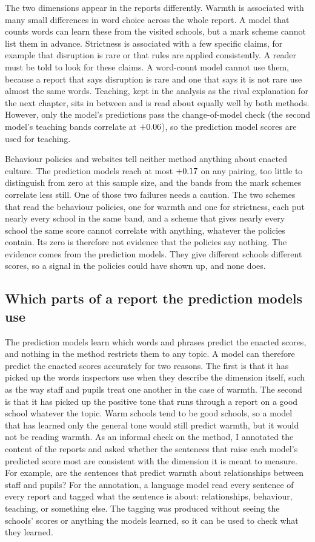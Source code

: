 The two dimensions appear in the reports differently. Warmth is associated with many small differences in word choice across the whole report. A model that counts words can learn these from the visited schools, but a mark scheme cannot list them in advance. Strictness is associated with a few specific claims, for example that disruption is rare or that rules are applied consistently. A reader must be told to look for these claims. A word-count model cannot use them, because a report that says disruption is rare and one that says it is not rare use almost the same words. Teaching, kept in the
analysis as the rival explanation for the next chapter, sits in between and is read about
equally well by both methods. However, only the model's predictions pass the change-of-model check (the second model's teaching bands correlate at $+0.06$), so
the prediction model scores are used for teaching.

Behaviour policies and websites tell neither method anything about enacted culture. The prediction
models reach at most $+0.17$ on any pairing, too little to distinguish from zero at this
sample size, and the bands from the mark schemes correlate less still. One of those two failures needs a caution. The
two schemes that read the behaviour policies, one for warmth and one for strictness, each put
nearly every school in the same band, and a scheme that gives nearly every school the same score
cannot correlate with anything, whatever the policies contain. Its zero is therefore not evidence that the policies say nothing. The evidence comes from the prediction models. They give different schools different scores, so a signal in the policies could have shown up, and none does.

\subsection{Which parts of a report the prediction models use}

The prediction models learn which words and phrases predict the enacted scores, and nothing in the method restricts them to any topic. A model can therefore predict the enacted scores accurately for two reasons. The first is that it has picked up the words inspectors use when they describe the dimension itself, such as the way staff and pupils treat one another in the case of warmth. The second is that it has picked up the positive tone that runs through a report on a good school whatever the topic. Warm schools tend to be good schools, so a model that has learned only the general tone would still predict warmth, but it would not be reading warmth. As an informal check on the method, I annotated the content of the reports and asked whether the sentences that raise each model's predicted score most are consistent with the dimension it is meant to measure. For example, are the sentences that predict warmth about relationships between staff and pupils? For the annotation, a language model read every sentence of every report and tagged what the sentence is about: relationships, behaviour, teaching, or something else. The tagging was produced without seeing the schools' scores or anything the models learned, so it can be used to check what they learned.

